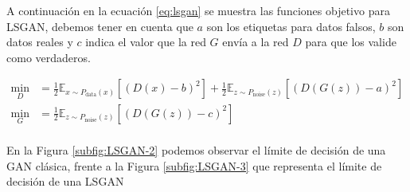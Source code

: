 A continuación en la ecuación \ref{eq:lsgan} se muestra las funciones objetivo para \gls{LSGAN}, debemos tener en cuenta que ${a}$ son los etiquetas para datos falsos, ${b}$ son datos reales y ${c}$ indica el valor que la red ${G}$ envía a la red ${D}$ para que los valide como verdaderos.

\begin{equation}
    \begin{split}
        \min_{D} &= \frac{1}{2} \mathbb{E}_{x\sim{}P_{\text{data}}(x)}  \left[ (D(x) - b)^{2} \right] + \frac{1}{2} \mathbb{E}_{z\sim{}P_{\text{noise}}(z)} \left[ (D(G(z)) - a)^{2} \right]    \\
        \min_{G} &= \frac{1}{2} \mathbb{E}_{z\sim{}P_{\text{noise}}(z)} \left[ (D(G(z)) - c)^{2} \right]                                                                                        \\
    \end{split}
    \label{eq:lsgan}
\end{equation}

En la Figura \ref{subfig:LSGAN-2} podemos observar el límite de decisión de una \gls{GAN} clásica, frente a la Figura \ref{subfig:LSGAN-3} que representa el límite de decisión de una \gls{LSGAN}


